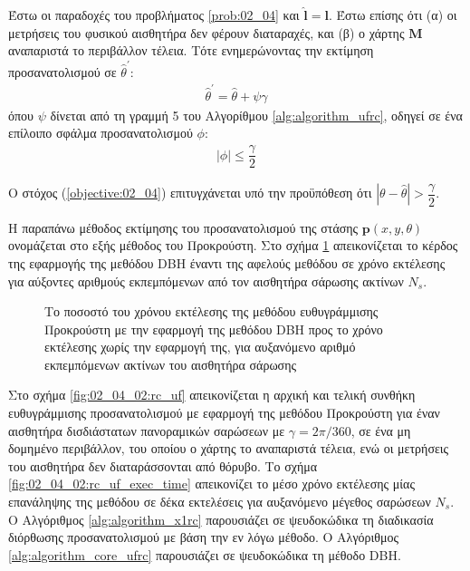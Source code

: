 \begin{lemma}
  Έστω οι παραδοχές του προβλήματος \ref{prob:02_04} και $\hat{\bm{l}} = \bm{l}$.
  Έστω επίσης ότι (α) οι μετρήσεις του φυσικού αισθητήρα δεν φέρουν
  διαταραχές, και (β) ο χάρτης $\bm{M}$ αναπαριστά το περιβάλλον τέλεια. Τότε
  ενημερώνοντας την εκτίμηση προσανατολισμού σε
  $\hat{\theta}^\prime$:
  \begin{align}
    \hat{\theta}^\prime = \hat{\theta} + \psi \gamma \label{eq:update_t3}
  \end{align}
  όπου $\psi$ δίνεται από τη γραμμή 5 του Αλγορίθμου \ref{alg:algorithm_ufrc},
  οδηγεί σε ένα επίλοιπο σφάλμα προσανατολισμού $\phi$:
  \begin{align}
    |\phi| \leq \dfrac{\gamma}{2}  \label{eq:phi_3}
  \end{align}
  \label{lemma:02_04_02:03}
\end{lemma}

\begin{corollary}
  Ο στόχος (\ref{objective:02_04}) επιτυγχάνεται υπό την προϋπόθεση ότι
  $|\theta-\hat{\theta}| > \dfrac{\gamma}{2}$.
\end{corollary}

Η παραπάνω μέθοδος εκτίμησης του προσανατολισμού της στάσης $\bm{p}(x,y,\theta)$
ονομάζεται στο εξής μέθοδος του Προκρούστη. Στο σχήμα
\ref{fig:02_04_02:ku_vs_dbh} απεικονίζεται το κέρδος της εφαρμογής της μεθόδου
DBH έναντι της αφελούς μεθόδου σε χρόνο εκτέλεσης για αύξοντες αριθμούς
εκπεμπόμενων από τον αισθητήρα σάρωσης ακτίνων $N_s$.

\begin{figure}[!h]\centering
  \vspace{1.0cm}
  
  \vspace{0.5cm}
  \caption{\small Το ποσοστό του χρόνου εκτέλεσης της μεθόδου ευθυγράμμισης
           Προκρούστη με την εφαρμογή της μεθόδου DBH προς το χρόνο εκτέλεσης
           χωρίς την εφαρμογή της, για αυξανόμενο αριθμό εκπεμπόμενων ακτίνων
           του αισθητήρα σάρωσης}
  \label{fig:02_04_02:ku_vs_dbh}
\end{figure}

Στο σχήμα \ref{fig:02_04_02:rc_uf} απεικονίζεται η αρχική και τελική συνθήκη
ευθυγράμμισης προσανατολισμού με εφαρμογή της μεθόδου Προκρούστη για έναν
αισθητήρα δισδιάστατων πανοραμικών σαρώσεων με $\gamma = 2\pi/360$, σε ένα μη
δομημένο περιβάλλον, του οποίου ο χάρτης το αναπαριστά τέλεια, ενώ οι μετρήσεις
του αισθητήρα δεν διαταράσσονται από θόρυβο. Το σχήμα
\ref{fig:02_04_02:rc_uf_exec_time} απεικονίζει το μέσο χρόνο εκτέλεσης
μίας επανάληψης της μεθόδου σε δέκα εκτελέσεις για αυξανόμενο μέγεθος σαρώσεων
$N_s$. Ο Αλγόριθμος \ref{alg:algorithm_x1rc} παρουσιάζει σε ψευδοκώδικα τη
διαδικασία διόρθωσης προσανατολισμού με βάση την εν λόγω μέθοδο. Ο Αλγόριθμος
\ref{alg:algorithm_core_ufrc} παρουσιάζει σε ψευδοκώδικα τη μέθοδο DBH.

